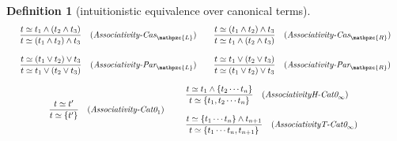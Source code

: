 \documentclass[12pt]{article}
\newtheorem{Definition}{Definition}[section]
\begin{document}
\begin{Definition}[intuitionistic equivalence over canonical terms]
\begin{displaymath}
\begin{array}{c}
      \begin{array}{ll}
        \begin{array}{rl}
          \dfrac{ t \simeq t_1 \wedge (t_2 \wedge t_3) }{
            t \simeq (t_1 \wedge t_2) \wedge t_3
          }  &  (\text{\it Associativity-Cas}_{\mathpzc{L}})
        \end{array}
        
        & \begin{array}{rl}
            \dfrac{t \simeq (t_1 \wedge t_2) \wedge t_3 }{
              t \simeq  t_1 \wedge (t_2 \wedge t_3)
            }  &  (\text{\it Associativity-Cas}_{\mathpzc{R}})
          \end{array}  \\
      \end{array}  \\
      \\
      
      \begin{array}{ll}
        \begin{array}{rl}
          \dfrac{ t \simeq (t_1 \vee t_2) \vee t_3 }{
            t \simeq t_1 \vee (t_2 \vee t_3)
          }  &  (\text{\it Associativity-Par}_{\mathpzc{L}})
        \end{array}      
        & \begin{array}{rl}
            \dfrac{t \simeq t_1 \vee (t_2 \vee t_3) }{
              t \simeq (t_1 \vee t_2) \vee t_3
            }  &  (\text{\it Associativity-Par}_{\mathpzc{R}})
          \end{array}
      \end{array}  \\
      \\
            
      \begin{array}{ll}
        \begin{array}{rl}
          \dfrac{ t \simeq t' }{ t \simeq \{t'\} }
          & (\text{\it Associativity-Cat0}_1)
        \end{array}
        & \begin{array}[c]{l}
            \begin{array}{rl}
              \dfrac{
                t \simeq t_1 \wedge \{t_2 \cdots t_n \}
              }{
                t \simeq \{t_1, t_2 \cdots t_n \}
              }  &  (\text{\it AssociativityH-Cat0}_\infty)
            \end{array}  \\
            \\
            \begin{array}{rl}
              \dfrac{
                t \simeq \{t_1 \cdots t_n \} \wedge t_{n+1}
              }{
                t \simeq \{t_1 \cdots t_n, t_{n+1} \}
              }  &  (\text{\it AssociativityT-Cat0}_\infty)
            \end{array}
          \end{array}
      \end{array}  \\
      \\
      

\end{array}
\end{displaymath}
\end{Definition}
\end{document}

